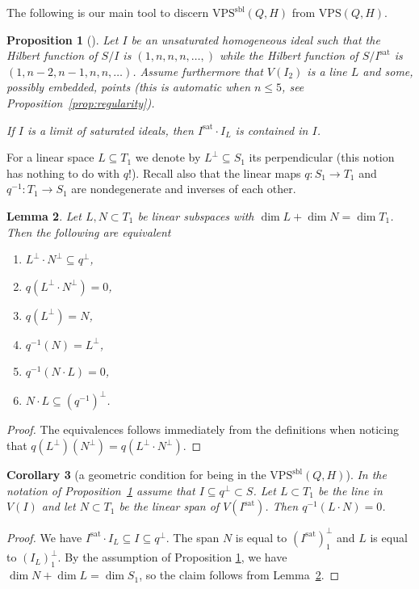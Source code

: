 \documentclass{amsart}
\newcommand{\VPSsbl}{{\mathrm{VPS}}^{\mathrm{sbl}}(Q, H)}
\newcommand{\VPS}{\mathrm{VPS}(Q, H)}
\newcommand{\sat}{\mathrm{sat}}%
\newtheorem{lemma}{\bf Lemma}[section]
\newtheorem{proposition}[lemma]{\bf Proposition}
\newtheorem{corollary}[lemma]{\bf Corollary}
\begin{document}
The following is our main tool to discern $\VPSsbl$ from $\VPS$.
\begin{proposition}[{\cite[Example~4.2]{JM}}]\label{prop:necessaryForLimitOfSat}
Let $I$ be an unsaturated homogeneous ideal such that the Hilbert function of
$S/I$ is $(1,n,n,n, \ldots ,)$ while the Hilbert function of $S/I^{\sat}$ is
$(1,n-2, n-1, n, n,  \ldots )$.  Assume furthermore that $V(I_2)$ is a line
$L$ and some, possibly embedded, points (this is automatic when $n\leq 5$,
see Proposition~\ref{prop:regularity}).

If $I$ is a limit of saturated ideals, then $I^{\sat}\cdot I_L$ is contained in $I$.
\end{proposition}

For a linear space $L \subseteq T_1$ we denote by $L^{\perp} \subseteq S_1$
its perpendicular (this notion has nothing to do with $q$!). Recall also that
the linear maps $q:S_1\to T_1$ and
$q^{-1}:T_1\to S_1$ are nondegenerate and inverses of each other.

\begin{lemma}\label{quadricPolarityLemma}
Let $L, N \subset T_1$ be linear subspaces with $\dim L + \dim N = \dim T_1$. Then the following are equivalent
\begin{enumerate}
    \item $L^\perp\cdot N^\perp \subseteq q^\perp$,
    \item $q(L^\perp\cdot N^\perp) = 0$,
    \item $q(L^\perp) = N$,
    \item $q^{-1}(N) = L^\perp$,
    \item $q^{-1}(N\cdot L) = 0$,
    \item $N \cdot L \subseteq (q^{-1})^{\perp}$.
\end{enumerate}
\end{lemma}
\begin{proof}
The equivalences follows immediately from the definitions when noticing that $q(L^\perp)(N^\perp)=q(L^\perp\cdot N^\perp)$.
\end{proof}

\begin{corollary}[a geometric condition for being in the $\VPSsbl$]\label{kri}
In the notation of Proposition~\ref{prop:necessaryForLimitOfSat} assume that $I\subseteq q^\perp\subset S$. Let $L\subset T_1$ be the line in $V(I)$  and let  $N\subset T_1$ be the linear span of $V(I^{\sat})$. Then $q^{-1}(L\cdot N) = 0$.
\end{corollary}
\begin{proof}
We have $I^{\sat}\cdot I_L \subseteq I \subseteq q^\perp$. The span $N$ is
equal to $(I^{\sat})_1^{\perp}$ and $L$ is equal to $(I_{L})_1^{\perp}$. By the assumption of Proposition \ref{prop:necessaryForLimitOfSat}, we have $\dim N + \dim L = \dim S_1$, so the claim follows from Lemma~\ref{quadricPolarityLemma}.
\end{proof}
\end{document}
